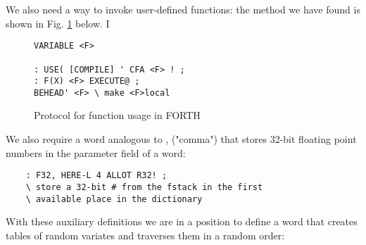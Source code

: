 We also need a way to invoke user-defined functions: the method
we have found is shown in Fig. \ref{fig:03_04} below. I

\begin{figure}[H]
    \label{fig:03_04}
    \begin{mdframed}
        \begin{lstlisting}
VARIABLE <F>

: USE( [COMPILE] ' CFA <F> ! ;
: F(X) <F> EXECUTE@ ;
BEHEAD' <F> \ make <F>local
        \end{lstlisting}
    \end{mdframed}
    \caption{Protocol for function usage in FORTH
}
\end{figure}

We also require a word analogous to , ("comma") that stores
32-bit floating point numbers in the parameter field of a word:

\begin{lstlisting}
    : F32, HERE-L 4 ALLOT R32! ;
    \ store a 32-bit # from the fstack in the first
    \ available place in the dictionary
\end{lstlisting}

With these auxiliary definitions we are in a position to define a
word that creates tables of random variates and traverses them in a random order:

